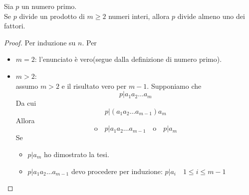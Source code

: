 \documentclass[a4paper,12pt, oneside]{book}
\begin{document}
	\begin{lemma}
		Sia $p$ un numero primo.\\
		Se $p$ divide un prodotto di $m \geq 2$ numeri interi, allora $p$ divide almeno uno dei fattori.
		
		\begin{proof}
			Per induzione su $n$.
			Per \begin{itemize}
				\item $m = 2$: l'enunciato è vero(segue dalla definizione di numero primo).
				\item $m > 2$:\\
					assumo $m>2$ e il risultato vero per $m-1$.
					Supponiamo che $$p|a_1a_2 \dots a_m$$
					Da cui $$p|(a_1a_2 \dots a_{m-1}) a_m$$
					Allora $$\mbox{o} \quad p|a_1a_2 \dots a_{m-1} \quad \mbox{o} \quad p|a_m$$
					Se \begin{itemize}
						\item $p|a_m$ ho dimostrato la tesi.
						\item $p|a_1a_2 \dots a_{m-1}$ devo procedere per induzione: $p|a_i \quad 1 \leq i \leq m-1$
					\end{itemize}
			\end{itemize}
		\end{proof}
	\end{lemma}
	
\end{document}
